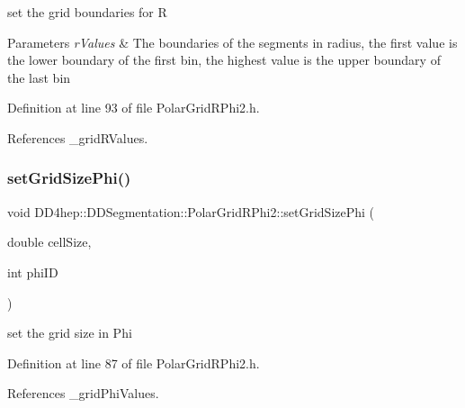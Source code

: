 set the grid boundaries for R 
\begin{DoxyParams}{Parameters}
{\em r\+Values} & The boundaries of the segments in radius, the first value is the lower boundary of the first bin, the highest value is the upper boundary of the last bin \\
\hline
\end{DoxyParams}


Definition at line 93 of file Polar\+Grid\+R\+Phi2.\+h.



References \+\_\+grid\+R\+Values.

\hypertarget{class_d_d4hep_1_1_d_d_segmentation_1_1_polar_grid_r_phi2_a349f115397bac2c6c4891353bcfd88b0}{}\label{class_d_d4hep_1_1_d_d_segmentation_1_1_polar_grid_r_phi2_a349f115397bac2c6c4891353bcfd88b0} 
\subsubsection{\texorpdfstring{set\+Grid\+Size\+Phi()}{setGridSizePhi()}}
{\footnotesize\ttfamily void D\+D4hep\+::\+D\+D\+Segmentation\+::\+Polar\+Grid\+R\+Phi2\+::set\+Grid\+Size\+Phi (\begin{DoxyParamCaption}\item[{double}]{cell\+Size,  }\item[{int}]{phi\+ID }\end{DoxyParamCaption})\hspace{0.3cm}{\ttfamily [inline]}}



set the grid size in Phi 



Definition at line 87 of file Polar\+Grid\+R\+Phi2.\+h.



References \+\_\+grid\+Phi\+Values.

\hypertarget{class_d_d4hep_1_1_d_d_segmentation_1_1_polar_grid_r_phi2_aa2807e9eae64b363d6a19cc605de5b81}{}\label{class_d_d4hep_1_1_d_d_segmentation_1_1_polar_grid_r_phi2_aa2807e9eae64b363d6a19cc605de5b81} 
